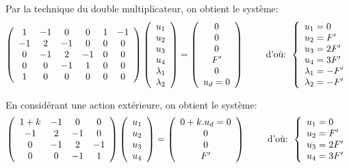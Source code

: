\medskip
Par la technique du double multiplicateur, on obtient le système:
\begin{equation}
\left( \begin{array}{cccccc} 1 & -1 & 0 & 0 & 1&-1 \\ -1 & 2 & -1 & 0 & 0&0 \\ 0 & -1 & 2 & -1 & 0&0\\ 0&0&-1&1& 0&0 \\ 1&0&0&0&0&0
\end{array}\right)
\left( \begin{array}{c} u_1\\u_2\\u_3\\u_4\\ \lambda_1 \\ \lambda_2 \end{array}\right)
=
\left( \begin{array}{c} 0\\0\\0\\F' \\ 0 \\ u_d=0\end{array}\right)
\qquad \text{ d'où: } 
\left\{\begin{array}{l} u_1=0 \\ u_2=F' \\ u_3=2F' \\ u_4=3F' \\ \lambda_1 = -F' \\ \lambda_2 = -F' \end{array}\right.
\end{equation}



\medskip
En considérant une action extérieure, on obtient le système:
\begin{equation}
\left( \begin{array}{cccc} 1+k & -1 & 0 & 0 \\ -1 & 2 & -1 & 0 \\ 0 & -1 & 2 & -1\\ 0&0&-1&1
\end{array}\right)
\left( \begin{array}{c} u_1\\u_2\\u_3\\u_4 \end{array}\right)
=
\left( \begin{array}{c} 0+k.u_d = 0\\0\\0\\F' \end{array}\right)
\qquad \text{ d'où: } 
\left\{\begin{array}{l} u_1=0 \\ u_2=F' \\ u_3=2F' \\ u_4=3F' \end{array}\right.
\end{equation}


